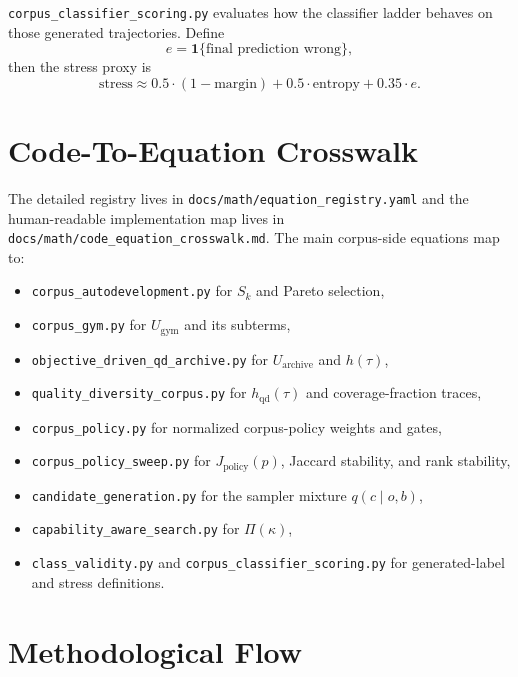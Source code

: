 \documentclass[11pt]{article}
\begin{document}
\texttt{corpus\_classifier\_scoring.py} evaluates how the classifier ladder
behaves on those generated trajectories. Define
\begin{equation}
    e = \mathbf{1}\{\text{final prediction wrong}\},
\end{equation}
then the stress proxy is
\begin{equation}
    \text{stress}
    \approx
    0.5 \cdot (1 - \text{margin})
    + 0.5 \cdot \text{entropy}
    + 0.35 \cdot e.
\end{equation}

\section{Code-To-Equation Crosswalk}

The detailed registry lives in \texttt{docs/math/equation\_registry.yaml} and
the human-readable implementation map lives in
\texttt{docs/math/code\_equation\_crosswalk.md}. The main corpus-side equations
map to:
\begin{itemize}[leftmargin=1.5em]
    \item \texttt{corpus\_autodevelopment.py} for \(S_k\) and Pareto selection,
    \item \texttt{corpus\_gym.py} for \(U_{\text{gym}}\) and its subterms,
    \item \texttt{objective\_driven\_qd\_archive.py} for \(U_{\text{archive}}\) and \(h(\tau)\),
    \item \texttt{quality\_diversity\_corpus.py} for \(h_{\text{qd}}(\tau)\) and coverage-fraction traces,
    \item \texttt{corpus\_policy.py} for normalized corpus-policy weights and gates,
    \item \texttt{corpus\_policy\_sweep.py} for \(J_{\text{policy}}(p)\), Jaccard stability, and rank stability,
    \item \texttt{candidate\_generation.py} for the sampler mixture \(q(c \mid o,b)\),
    \item \texttt{capability\_aware\_search.py} for \(\Pi(\kappa)\),
    \item \texttt{class\_validity.py} and \texttt{corpus\_classifier\_scoring.py} for generated-label and stress definitions.
\end{itemize}

\section{Methodological Flow}
\end{document}
